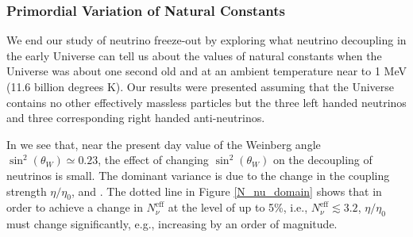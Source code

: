 \subsubsection{Primordial Variation of Natural Constants}
We end our study of neutrino freeze-out by exploring what neutrino decoupling in the early Universe can tell us about the values of natural constants when the Universe was about one second old and at an ambient temperature near to 1 MeV (11.6 billion degrees K). Our results were presented assuming that the Universe contains no other effectively massless particles but the three left handed neutrinos and  three corresponding right handed anti-neutrinos. 

In  we see that, near  the present day value of the Weinberg angle  $\sin^2(\theta_W)\simeq 0.23$, the effect of changing $\sin^2(\theta_W)$ on the decoupling of neutrinos is small. The dominant variance is due to the change  in the coupling strength $\eta/\eta_0$,   and . The dotted line in  Figure \ref{N_nu_domain} shows that in order to achieve a change in $N_\nu^{\mathrm{eff}}$ at the level of up to 5\%, i.e., $N_\nu^{\mathrm{eff}}\lesssim 3.2 $,   $\eta/\eta_0$ must change significantly, e.g.,  increasing by an order of magnitude.

